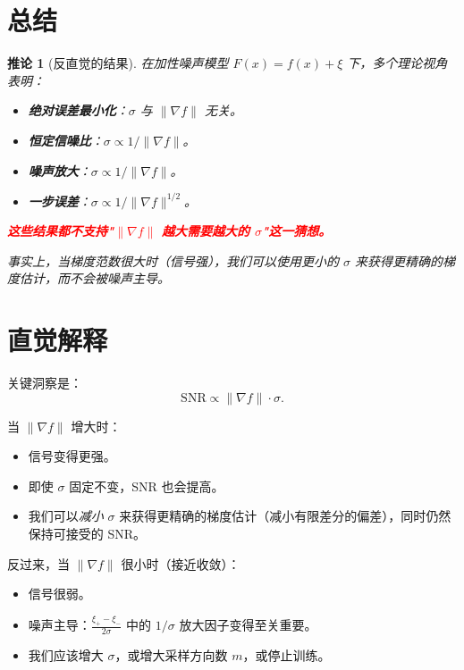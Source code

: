 \documentclass{article}
\newtheorem{corollary}{推论}
\begin{document}
\section{总结}

\begin{corollary}[反直觉的结果]
在加性噪声模型 $F(x) = f(x) + \xi$ 下，多个理论视角表明：
\begin{itemize}
\item \textbf{绝对误差最小化}：$\sigma$ 与 $\|\nabla f\|$ 无关。
\item \textbf{恒定信噪比}：$\sigma \propto 1/\|\nabla f\|$。
\item \textbf{噪声放大}：$\sigma \propto 1/\|\nabla f\|$。
\item \textbf{一步误差}：$\sigma \propto 1/\|\nabla f\|^{1/2}$。
\end{itemize}

\textcolor{red}{\textbf{这些结果都不支持"$\|\nabla f\|$ 越大需要越大的 $\sigma$"这一猜想。}}

事实上，当梯度范数很大时（信号强），我们可以使用\emph{更小}的 $\sigma$ 来获得更精确的梯度估计，而不会被噪声主导。
\end{corollary}

\section{直觉解释}

关键洞察是：
\[
\text{SNR} \propto \|\nabla f\| \cdot \sigma.
\]

当 $\|\nabla f\|$ 增大时：
\begin{itemize}
\item 信号变得更强。
\item 即使 $\sigma$ 固定不变，SNR 也会提高。
\item 我们可以\emph{减小} $\sigma$ 来获得更精确的梯度估计（减小有限差分的偏差），同时仍然保持可接受的 SNR。
\end{itemize}

反过来，当 $\|\nabla f\|$ 很小时（接近收敛）：
\begin{itemize}
\item 信号很弱。
\item 噪声主导：$\frac{\xi_+ - \xi_-}{2\sigma}$ 中的 $1/\sigma$ 放大因子变得至关重要。
\item 我们应该增大 $\sigma$，或增大采样方向数 $m$，或停止训练。
\end{itemize}
\end{document}
